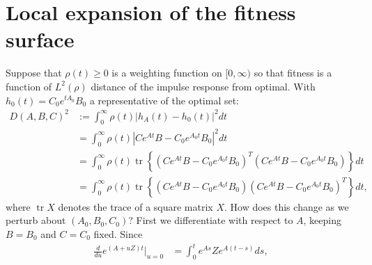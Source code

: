 \documentclass{article}
\newcommand{\tr}{\mathop{\mbox{tr}}} %
\newcommand{\1}{\mathbbm{1}}
\begin{document}



\normalsize
\appendix

\section{Local expansion of the fitness surface}
\label{apx:H_calc}

Suppose that $\rho(t) \ge 0$ is a weighting function on $[0,\infty)$
so that fitness is a function of $L^2(\rho)$ distance of the impulse response from optimal.
With $h_0(t) = C_0 e^{tA_0} B_0$ a representative of the optimal set:
\begin{equation}
    \begin{aligned}
        D(A, B, C)^2
        &:= 
        \int_0^\infty \rho(t) \left| h_A(t) - h_0(t) \right|^2 dt \\
        &= 
        \int_0^\infty \rho(t) \left| C e^{At} B - C_0 e^{A_0 t} B_0 \right|^2 dt \\
        &= 
        \int_0^\infty \rho(t) \tr\left\{
            \left( C e^{At} B - C_0 e^{A_0 t} B_0 \right)^T
            \left( C e^{At} B - C_0 e^{A_0 t} B_0 \right)
        \right\} dt \\
        &= 
        \int_0^\infty \rho(t) \tr\left\{
            \left( C e^{At} B - C_0 e^{A_0 t} B_0 \right)
            \left( C e^{At} B - C_0 e^{A_0 t} B_0 \right)^T
        \right\} dt  ,
    \end{aligned}
\end{equation}
where $\tr X$ denotes the trace of a square matrix $X$.
How does this change as we perturb about $(A_0, B_0, C_0)$?
First we differentiate with respect to $A$, keeping $B=B_0$ and $C=C_0$ fixed.
Since
\begin{equation}
  \begin{aligned}
      \frac{d}{du} e^{(A+uZ)t} \vert_{u=0}
      &=
      \int_0^t e^{As} Z e^{A(t-s)} ds, 
  \end{aligned}
\end{equation}
\end{document}
